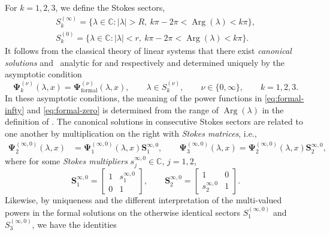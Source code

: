 \documentclass[pdftex]{sigma}
\numberwithin{equation}{section}
\newcommand{\C}{{\mathbb{C}}}
\renewcommand{\arg}{\operatorname{Arg}}
\begin{document}
For $k = 1, 2,3$, we define the Stokes sectors,
\begin{gather*}
S_k^{(\infty)} = \bigl\{ \lambda \in \C \colon |\lambda| > R, \ k\pi - 2\pi < \arg (\lambda) < k\pi \bigr \},\\
S_k^{(0)} = \bigl \{ \lambda \in \C \colon |\lambda| < r, \ k\pi - 2\pi < \arg (\lambda) < k\pi \bigr\}.
\end{gather*}
 It follows from the classical theory of linear systems that there exist \emph{canonical solutions}  and~ analytic for  and  respectively and determined uniquely by the asymptotic condition
\begin{equation}
\mathbf{\Psi}_k^{(\nu)}(\lambda, x) = \mathbf{\Psi}^{(\nu)}_{\text{formal}}(\lambda, x), \qquad \lambda \in S_k^{(\nu)}, \qquad \nu \in \{0, \infty\}, \qquad k=1,2,3.
\label{eq:psi-asymptotic-condition}
\end{equation}
In these asymptotic conditions, the meaning of the power functions in \eqref{eq:formal-infty} and \eqref{eq:formal-zero} is determined from the range of $\arg(\lambda)$ in the definition of .
The canonical solutions in consecutive Stokes sectors are related to one another by multiplication on the right with \emph{Stokes matrices}, i.e.,
\begin{align}%
\label{eq:stokes-condition-1}\mathbf{\Psi}_2^{(\infty, 0)}(\lambda, x) &= \mathbf{\Psi}_1^{(\infty, 0)}(\lambda, x) \mathbf{S}^{\infty, 0}_{1}, \qquad
\mathbf{\Psi}_3^{(\infty, 0)}(\lambda, x) = \mathbf{\Psi}_2^{(\infty, 0)}( \lambda, x) \mathbf{S}^{\infty, 0}_{2},
\end{align}
where for some \emph{Stokes multipliers} $s_j^{\infty,0}\in\mathbb{C}$, $j=1,2$,
\begin{equation}
\mathbf{S}^{\infty, 0}_{1}= \begin{bmatrix}1&s^{\infty, 0}_1\\0&1\end{bmatrix},\qquad \mathbf{S}^{\infty, 0}_{{2}}=
\begin{bmatrix}1&0\\{s^{\infty, 0}_2}&1\end{bmatrix}.
 \label{eq:Stokes-infty}
\end{equation}
Likewise, by uniqueness and the different interpretation of the multi-valued powers in the formal solutions on the otherwise identical sectors $S^{(\infty,0)}_1$ and $S^{(\infty,0)}_3$, we have the identities
\end{document}

